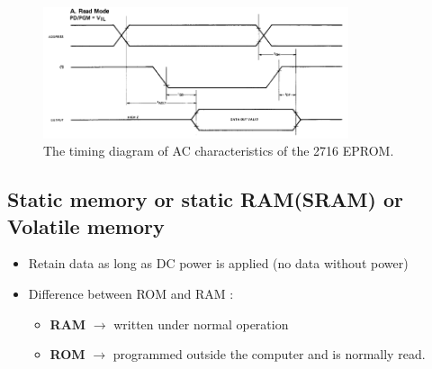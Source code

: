 \begin{figure}[h!]
  \includegraphics[width = 0.8\textwidth]{./figures/Memory_waveform.png}
  \caption{The timing diagram of AC characteristics of the 2716 EPROM.}
  \label{}
\end{figure}

\subsection{Static memory or static RAM(SRAM) or Volatile memory}
\begin{itemize}
  \item Retain data as long as DC power is applied (no data without power)
  \item Difference between ROM and RAM :
  \begin{itemize}
    \item \textbf{RAM} $\longrightarrow$ written under normal operation
    \item \textbf{ROM} $\longrightarrow$ programmed outside the computer and is normally read.

  \end{itemize}
\end{itemize}


